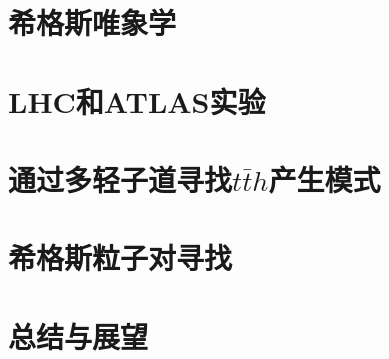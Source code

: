 
\chapter{希格斯唯象学}\label{chap:higgs_pheno}


\chapter{LHC和ATLAS实验}\label{chap:lhc_atlas}





\chapter{通过多轻子道寻找$t\bar{t}h$产生模式}\label{chap:tth_multilep}




\chapter{希格斯粒子对寻找}\label{chap:hh_serach}








\chapter{总结与展望}\label{chap:conclusions}

%
